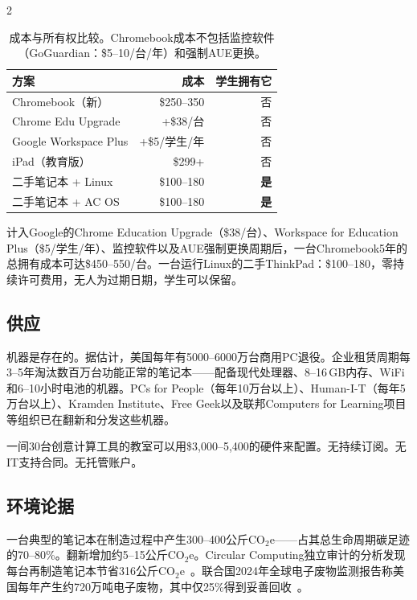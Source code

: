 \documentclass[11pt, a4paper]{article}
\begin{document}
\begin{multicols}{2}
\begin{table}[H]
\small
\centering
\begin{tabular}{lrr}
\toprule
\textbf{方案} & \textbf{成本} & \textbf{学生拥有它} \\
\midrule
Chromebook（新） & \$250--350 & 否 \\
Chrome Edu Upgrade & +\$38/台 & 否 \\
Google Workspace Plus & +\$5/学生/年 & 否 \\
iPad（教育版） & \$299+ & 否 \\
\midrule
二手笔记本 + Linux & \$100--180 & \textbf{是} \\
二手笔记本 + AC OS & \$100--180 & \textbf{是} \\
\bottomrule
\end{tabular}
\caption{成本与所有权比较。Chromebook成本不包括监控软件（GoGuardian：\$5--10/台/年）和强制AUE更换。}
\label{tab:cost}
\end{table}

计入Google的Chrome Education Upgrade（\$38/台）、Workspace for Education Plus（\$5/学生/年）、监控软件以及AUE强制更换周期后，一台Chromebook5年的总拥有成本可达\$450--550/台。一台运行Linux的二手ThinkPad：\$100--180，零持续许可费用，无人为过期日期，学生可以保留。

\subsection{供应}

机器是存在的。据估计，美国每年有5000--6000万台商用PC退役。企业租赁周期每3--5年淘汰数百万台功能正常的笔记本——配备现代处理器、8--16\,GB内存、WiFi和6--10小时电池的机器。PCs for People（每年10万台以上）、Human-I-T（每年5万台以上）、Kramden Institute、Free Geek以及联邦Computers for Learning项目等组织已在翻新和分发这些机器。

一间30台创意计算工具的教室可以用\$3,000--5,400的硬件来配置。无持续订阅。无IT支持合同。无托管账户。

\subsection{环境论据}

一台典型的笔记本在制造过程中产生300--400公斤CO$_2$e——占其总生命周期碳足迹的70--80\%。翻新增加约5--15公斤CO$_2$e。Circular Computing独立审计的分析发现每台再制造笔记本节省316公斤CO$_2$e~\citep{circularcomputing2023carbon}。联合国2024年全球电子废物监测报告称美国每年产生约720万吨电子废物，其中仅25\%得到妥善回收~\citep{un2024ewaste}。


\end{multicols}
\end{document}
